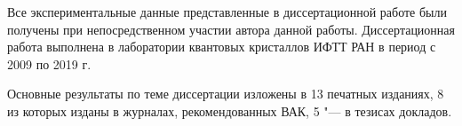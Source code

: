 {\contribution} Все экспериментальные данные представленные в диссертационной работе были получены при непосредственном участии автора данной работы. Диссертационная работа выполнена в лаборатории квантовых кристаллов ИФТТ РАН в период с 2009 по 2019 г.


     Основные результаты по теме диссертации изложены в 13 печатных изданиях, 
    8 из которых изданы в журналах, рекомендованных ВАК, 
    5 "--- в тезисах докладов.%
    

